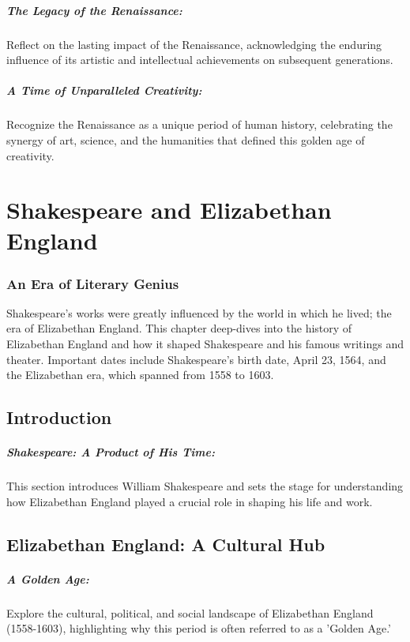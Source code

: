 \documentclass[a4paper,12pt]{book}
\begin{document}
\paragraph{The Legacy of the Renaissance:}
Reflect on the lasting impact of the Renaissance, acknowledging the enduring influence of its artistic and intellectual achievements on subsequent generations.

\paragraph{A Time of Unparalleled Creativity:}
Recognize the Renaissance as a unique period of human history, celebrating the synergy of art, science, and the humanities that defined this golden age of creativity.



\chapter{Shakespeare and Elizabethan England}
\subsection*{An Era of Literary Genius}
Shakespeare's works were greatly influenced by the world in which he lived; the era of Elizabethan England. This chapter deep-dives into the history of Elizabethan England and how it shaped Shakespeare and his famous writings and theater. Important dates include Shakespeare's birth date, April 23, 1564, and the Elizabethan era, which spanned from 1558 to 1603.

\section*{Introduction}

\paragraph{Shakespeare: A Product of His Time:}
This section introduces William Shakespeare and sets the stage for understanding how Elizabethan England played a crucial role in shaping his life and work.

\section*{Elizabethan England: A Cultural Hub}

\paragraph{A Golden Age:}
Explore the cultural, political, and social landscape of Elizabethan England (1558-1603), highlighting why this period is often referred to as a 'Golden Age.'
\end{document}
